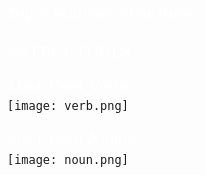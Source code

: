 \documentclass[12pt]{article}
\begin{document}
\begin{titlepage}
    \noindent
    \LARGE
    \fontsize{20}{20}\selectfont\textcolor{white}{\textbf{
            Top 5 Sentence Structures:\\\\
        }}
    \LARGE
    \fontsize{15}{15}\selectfont\textcolor{white}{\textbf{
            @STRUCTURES
        }}


    \vspace{0.8cm}
    \newpage
    \pagecolor{lb}\afterpage{\nopagecolor}
    \begin{center}
        \noindent
        \LARGE
        \fontsize{20}{20}\selectfont\textcolor{white}{\textbf{
                Most Used Verbs:\\
            }}
        \LARGE
        \vspace{0.5cm}
        \texttt{[image: verb.png]}
    \end{center}
    \begin{center}
        \noindent
        \LARGE
        \fontsize{20}{20}\selectfont\textcolor{white}{\textbf{
                Most Used Nouns:\\
            }}
        \LARGE
        \vspace{0.5cm}
        \texttt{[image: noun.png]}
    \end{center}

\end{titlepage}
\end{document}
